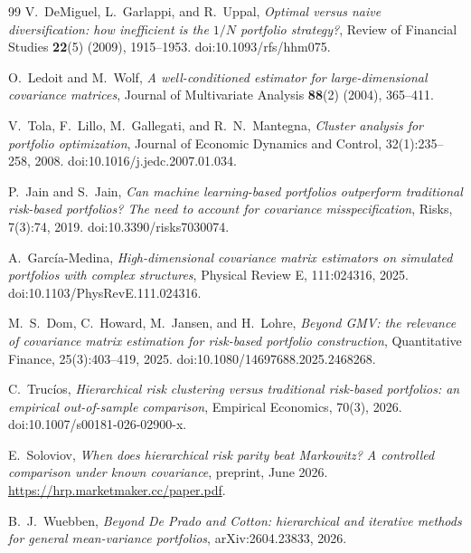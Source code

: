 \documentclass[11pt]{article}
\theoremstyle{remark}
\begin{document}
\begin{thebibliography}{99}
V.~DeMiguel, L.~Garlappi, and R.~Uppal,
\emph{Optimal versus naive diversification: how inefficient is the $1/N$
portfolio strategy?},
Review of Financial Studies \textbf{22}(5) (2009), 1915--1953.
doi:10.1093/rfs/hhm075.

O.~Ledoit and M.~Wolf,
\emph{A well-conditioned estimator for large-dimensional covariance
matrices},
Journal of Multivariate Analysis \textbf{88}(2) (2004), 365--411.


V.~Tola, F.~Lillo, M.~Gallegati, and R.~N.~Mantegna,
\emph{Cluster analysis for portfolio optimization},
Journal of Economic Dynamics and Control, 32(1):235--258, 2008.
doi:10.1016/j.jedc.2007.01.034.

P.~Jain and S.~Jain,
\emph{Can machine learning-based portfolios outperform traditional risk-based
portfolios? The need to account for covariance misspecification},
Risks, 7(3):74, 2019. doi:10.3390/risks7030074.

A.~Garc\'ia-Medina,
\emph{High-dimensional covariance matrix estimators on simulated portfolios
with complex structures},
Physical Review E, 111:024316, 2025. doi:10.1103/PhysRevE.111.024316.

M.~S.~Dom, C.~Howard, M.~Jansen, and H.~Lohre,
\emph{Beyond GMV: the relevance of covariance matrix estimation for
risk-based portfolio construction},
Quantitative Finance, 25(3):403--419, 2025.
doi:10.1080/14697688.2025.2468268.

C.~Truc\'ios,
\emph{Hierarchical risk clustering versus traditional risk-based portfolios:
an empirical out-of-sample comparison},
Empirical Economics, 70(3), 2026. doi:10.1007/s00181-026-02900-x.

E.~Soloviov,
\emph{When does hierarchical risk parity beat Markowitz? A controlled
comparison under known covariance},
preprint, June 2026. \url{https://hrp.marketmaker.cc/paper.pdf}.

B.~J.~Wuebben,
\emph{Beyond De Prado and Cotton: hierarchical and iterative methods for
general mean-variance portfolios},
arXiv:2604.23833, 2026.

\end{thebibliography}
\end{document}
